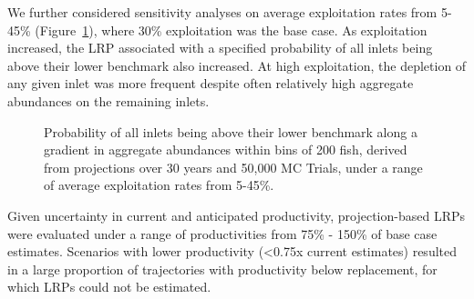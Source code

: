 \documentclass[11pt]{book}
\begin{document}
We further considered sensitivity analyses on average exploitation rates from 5-45\% (Figure~\ref{fig:chinook-projLRPER}), where 30\% exploitation was the base case. As exploitation increased, the LRP associated with a specified probability of all inlets being above their lower benchmark also increased. At high exploitation, the depletion of any given inlet was more frequent despite often relatively high aggregate abundances on the remaining inlets.
\begin{figure}[htb]

{\centering {} 

}

\caption{Probability of all inlets being above their lower benchmark along a gradient in aggregate abundances within bins of 200 fish, derived from projections over 30 years and 50,000 MC Trials, under a range of average exploitation rates from 5-45\%.}\label{fig:chinook-projLRPER}
\end{figure}
\linebreak

Given uncertainty in current and anticipated productivity, projection-based LRPs were evaluated under a range of productivities from 75\% - 150\% of base case estimates. Scenarios with lower productivity (\textless0.75x current estimates) resulted in a large proportion of trajectories with productivity below replacement, for which LRPs could not be estimated.
\end{document}
